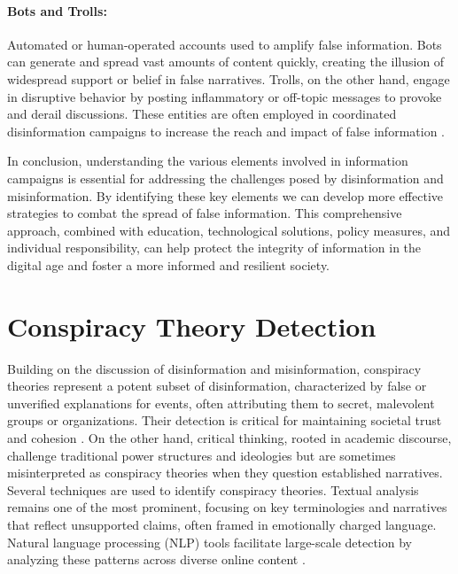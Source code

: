\documentclass{Configuration_Files/PoliMi3i_thesis}
\begin{document}
\paragraph{Bots and Trolls:} Automated or human-operated accounts used to amplify false information. Bots can generate and spread vast amounts of content quickly, creating the illusion of widespread support or belief in false narratives. Trolls, on the other hand, engage in disruptive behavior by posting inflammatory or off-topic messages to provoke and derail discussions. These entities are often employed in coordinated disinformation campaigns to increase the reach and impact of false information \cite{ferrara2017disinformation}.

In conclusion, understanding the various elements involved in information campaigns is essential for addressing the challenges posed by disinformation and misinformation. By identifying these key elements we can develop more effective strategies to combat the spread of false information. This comprehensive approach, combined with education, technological solutions, policy measures, and individual responsibility, can help protect the integrity of information in the digital age and foster a more informed and resilient society.

\section{Conspiracy Theory Detection} \label{sec:conspiracy_theory_detection}
Building on the discussion of disinformation and misinformation, conspiracy theories represent a potent subset of disinformation, characterized by false or unverified explanations for events, often attributing them to secret, malevolent groups or organizations. Their detection is critical for maintaining societal trust and cohesion \cite{douglas2023conspiracy}. On the other hand, critical thinking, rooted in academic discourse, challenge traditional power structures and ideologies but are sometimes misinterpreted as conspiracy theories when they question established narratives. Several techniques are used to identify conspiracy theories. Textual analysis remains one of the most prominent, focusing on key terminologies and narratives that reflect unsupported claims, often framed in emotionally charged language. Natural language processing (NLP) tools facilitate large-scale detection by analyzing these patterns across diverse online content \cite{marcellino2021detecting}.
\end{document}
